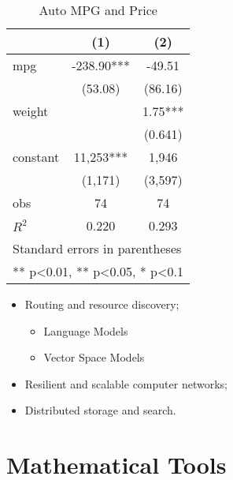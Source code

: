 \documentclass[noanswer,fancy,blue,11pt]{elegantbook}
\begin{document}
\begin{table}[htbp]
  \small
  \centering
  \caption{Auto MPG and Price \label{tab:reg}}
    \begin{tabular}{lcc}
    \toprule
                    &       (1)         &        (2)      \\
    \midrule
    mpg             &    -238.90***     &      -49.51     \\
                    &     (53.08)       &      (86.16)    \\
    weight          &                   &      1.75***    \\
                    &                   &      (0.641)    \\
    constant        &     11,253***     &       1,946     \\
                    &     (1,171)       &      (3,597)   \\
    obs             &        74         &         74     \\
    $R^2$           &      0.220        &       0.293    \\
    \bottomrule
    \multicolumn{3}{l}{\scriptsize Standard errors in parentheses} \\
    \multicolumn{3}{l}{\scriptsize *** p<0.01, ** p<0.05, * p<0.1} \\
    \end{tabular}%
\end{table}%

\lipsum[1-2]

\begin{itemize}
	\item Routing and resource discovery;
	     \begin{itemize} 
      	   	\item Language Models
       	 	\item Vector Space Models
    		 \end{itemize}
	\item Resilient and scalable computer networks;
	\item Distributed storage and search.
\end{itemize}


\nocite{Havrylchyk2018} 



\appendix
\chapter{Mathematical Tools}
\end{document}
